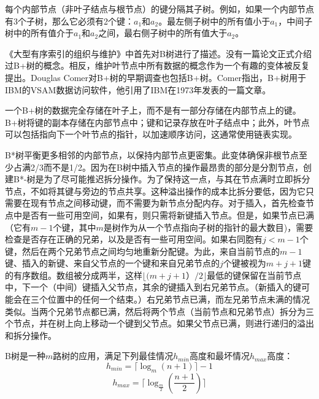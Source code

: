 每个内部节点（非叶子结点与根节点）的键分隔其子树。例如，如果一个内部节点有3个子树，那么它必须有2个键：$a_1$和$a_2$。最左侧子树中的所有值小于$a_1$，中间子树中的所有值介于$a_1$和$a_2$之间，最右侧子树中的所有值大于$a_2$。

《大型有序索引的组织与维护》中首先对B树进行了描述。没有一篇论文正式介绍过B+树的概念。相反，维护叶节点中所有数据的概念作为一个有趣的变体被反复提出。Douglas Comer对B+树的早期调查也包括B+树。Comer指出，B+树用于IBM的VSAM数据访问软件，他引用了IBM在1973年发表的一篇文章。

一个B+树的数据完全存储在叶子上，而不是有一部分存储在内部节点上的键。B+树将键的副本存储在内部节点中；键和记录存放在叶子结点中；此外，叶节点可以包括指向下一个叶节点的指针，以加速顺序访问，这通常使用链表实现。

B*树平衡更多相邻的内部节点，以保持内部节点更密集。此变体确保非根节点至少占满2/3而不是1/2。因为在B树中插入节点的操作最昂贵的部分是分割节点，创建B*-树是为了尽可能推迟拆分操作。为了保持这一点，与其在节点满时立即拆分节点，不如将其键与旁边的节点共享。这种溢出操作的成本比拆分要低，因为它只需要在现有节点之间移动键，而不需要为新节点分配内存。对于插入，首先检查节点中是否有一些可用空间，如果有，则只需将新键插入节点。但是，如果节点已满（它有$m−1$个键，其中$m$是树作为从一个节点指向子树的指针的最大数目)，需要检查是否存在正确的兄弟，以及是否有一些可用空间。如果右同胞有$j<m− 1$个键，然后在两个兄弟节点之间均匀地重新分配键。为此，来自当前节点的$m-1$键、插入的新键、来自父节点的一个键和来自兄弟节点的$j$个键被视为$m+j+1$键的有序数组。数组被分成两半，这样$⌊(m+j+1）/2⌋$最低的键保留在当前节点中，下一个（中间）键插入父节点，其余的键插入到右兄弟节点。（新插入的键可能会在三个位置中的任何一个结束。）右兄弟节点已满，而左兄弟节点未满的情况类似。当两个兄弟节点都已满，然后将两个节点（当前节点和兄弟节点）拆分为三个节点，并在树上向上移动一个键到父节点。如果父节点已满，则进行递归的溢出和拆分操作。

B树是一种$m$路树的应用，满足下列最佳情况$h_{min}高度$和最坏情况$h_{max}$高度：
$$h_{min} = ⌈\log_m(n+1)⌉-1$$
$$h_{max} = ⌈\log_{\frac{m}{2}}(\frac{n+1}{2})⌉$$



